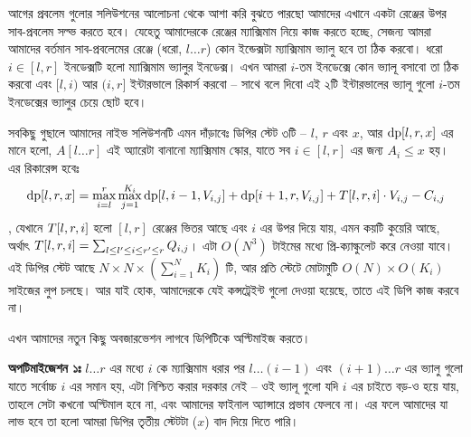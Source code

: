 \begin{solution}
  আগের প্রবলেম গুলোর সলিউশনের আলোচনা থেকে আশা করি বুঝতে পারছো আমাদের এখানে
  একটা রেঞ্জের উপর সাব-প্রবলেম সল্ভ করতে হবে। যেহেতু আমাদেরকে রেঞ্জের
  ম্যাক্সিমাম নিয়ে কাজ করতে হচ্ছে, সেজন্য আমরা আমাদের
  বর্তমান সাব-প্রবলেমের রেঞ্জে (ধরো, $l \ldots r$) কোন ইন্ডেক্সটা ম্যাক্সিমাম
  ভ্যালু হবে তা ঠিক করবো। ধরো $i \in [l, r]$ ইনডেক্সটি হলো ম্যাক্সিমাম
  ভ্যালুর ইনডেক্স। এখন আমরা $i$-তম ইনডেক্সে কোন ভ্যালূ বসাবো তা ঠিক করবো এবং
  $[l, i)$ আর $(i, r]$ ইন্টারভালে রিকার্স করবো -- সাথে বলে দিবো এই ২টি
  ইন্টারভালের ভ্যালূ গুলো $i$-তম ইনডেক্সের ভ্যালুর চেয়ে ছোট হবে।

  সবকিছু গুছালে আমাদের নাইভ সলিউশনটি এমন দাঁড়াবেঃ ডিপির স্টেট ৩টি -- $l$, $r$
  এবং $x$, আর $\text{dp}[l, r, x]$ এর মানে হলো, $A[l \ldots r]$ এই অ্যারেটা
  বানানো ম্যাক্সিমাম স্কোর, যাতে সব $i \in [l, r]$ এর জন্য $A_i \le x$ হয়। এর
  রিকারেন্স হবেঃ
  \[
    \text{dp}[l, r, x] = \max_{i=l}^{r} \max_{j=1}^{K_i}
    \text{dp}[l, i-1, V_{i, j}] + \text{dp}[i+1, r, V_{i, j}] +
    T[l, r, i] \cdot V_{i,j} - C_{i,j}
  \], যেখানে $T[l, r, i]$ হলো $[l, r]$ রেঞ্জের ভিতর আছে এবং $i$ এর উপর
  দিয়ে যায়, এমন কয়টি কুয়েরি আছে, অর্থাৎ $T[l, r, i] = \sum_{l \le
  l^\prime \le i \le r^\prime \le r} Q_{i,j}$। এটা $O(N^3)$ টাইমের মধ্যে
  প্রি-ক্যাল্কুলেট করে নেওয়া যাবে। এই ডিপির স্টেট আছে $N \times N \times
  \left(\sum_{i=1}^{N} K_i\right)$ টি, আর প্রতি স্টেটে মোটামুটি $O(N) \times
  O(K_i)$ সাইজের লুপ চলছে। আর যাই হোক, আমাদেরকে যেই কন্সট্রেইন্ট গুলো দেওয়া
  হয়েছে, তাতে এই ডিপি কাজ করবে না।

  এখন আমাদের নতুন কিছু অবজারভেশন লাগবে ডিপিটিকে অপ্টিমাইজ করতে।

  \textbf{অপটিমাইজেশন ১ঃ} $l \ldots r$ এর মধ্যে $i$ কে ম্যাক্সিমাম ধরার পর $l
  \ldots (i-1)$ এবং $(i+1) \ldots r$ এর ভ্যালু গুলো যাতে সর্বোচ্চ $i$ এর সমান
  হয়, এটা নিশ্চিত করার দরকার নেই -- ওই ভ্যালূ গুলো যদি $i$ এর চাইতে বড়-ও হয়ে
  যায়, তাহলে সেটা কখনো অপ্টিমাল হবে না, এবং আমাদের ফাইনাল অ্যান্সারে প্রভাব
  ফেলবে না। এর ফলে আমাদের যা লাভ হবে তা হলো আমরা ডিপির তৃতীয় স্টেটটা ($x$)
  বাদ দিয়ে দিতে পারি।


\end{solution}

